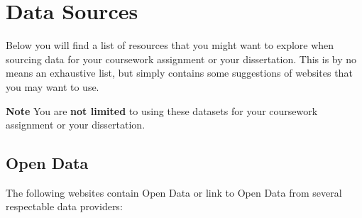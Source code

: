 \documentclass[
]{book}
\begin{document}
\hypertarget{data-sources}{%
\chapter{Data Sources}\label{data-sources}}

Below you will find a list of resources that you might want to explore when sourcing data for your coursework assignment or your dissertation. This is by no means an exhaustive list, but simply contains some suggestions of websites that you may want to use.

\textbf{Note}
You are \textbf{not limited} to using these datasets for your coursework assignment or your dissertation.

\hypertarget{open-data}{%
\section{Open Data}\label{open-data}}

The following websites contain Open Data or link to Open Data from several respectable data providers:
\end{document}
